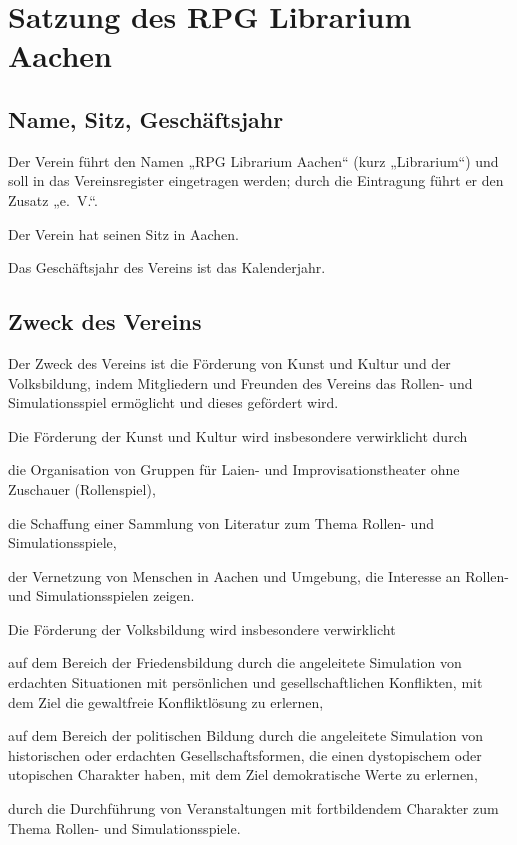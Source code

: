 



	\midsloppy
\chapter{Satzung des RPG Librarium Aachen}
\section{Name, Sitz, Geschäftsjahr}
\begin{para}
	\item Der Verein führt den Namen „RPG Librarium Aachen“ (kurz „Librarium“) und soll in das Vereinsregister eingetragen werden; durch die Eintragung führt er den Zusatz „e.~V.“.
	\item Der Verein hat seinen Sitz in Aachen.
	\item Das Geschäftsjahr des Vereins ist das Kalenderjahr.
\end{para}

\section{Zweck des Vereins}
\begin{para}
	\item Der Zweck des Vereins ist die Förderung von Kunst und Kultur und der Volksbildung, indem Mitgliedern und Freunden des Vereins das Rollen- und Simulationsspiel ermöglicht und dieses gefördert wird.
	\item Die Förderung der Kunst und Kultur wird insbesondere verwirklicht durch
	\begin{subpara}
		\item die Organisation von Gruppen für Laien- und Improvisationstheater ohne Zuschauer (Rollenspiel),
		\item die Schaffung einer Sammlung von Literatur zum Thema Rollen- und Simulationsspiele,
		\item der Vernetzung von Menschen in Aachen und Umgebung, die Interesse an Rollen- und Simulationsspielen zeigen.
	\end{subpara}
	\item Die Förderung der Volksbildung wird insbesondere verwirklicht 
	\begin{subpara}
		\item auf dem Bereich der Friedensbildung durch die angeleitete Simulation von erdachten Situationen mit persönlichen und gesellschaftlichen Konflikten, mit dem Ziel die gewaltfreie Konfliktlösung zu erlernen,
		\item auf dem Bereich der politischen Bildung durch die angeleitete Simulation von historischen oder erdachten Gesellschaftsformen, die einen dystopischem oder utopischen Charakter haben, mit dem Ziel demokratische Werte zu erlernen,
		\item durch die Durchführung von Veranstaltungen mit fortbildendem Charakter zum Thema Rollen- und Simulationsspiele.
	\end{subpara}
\end{para}

